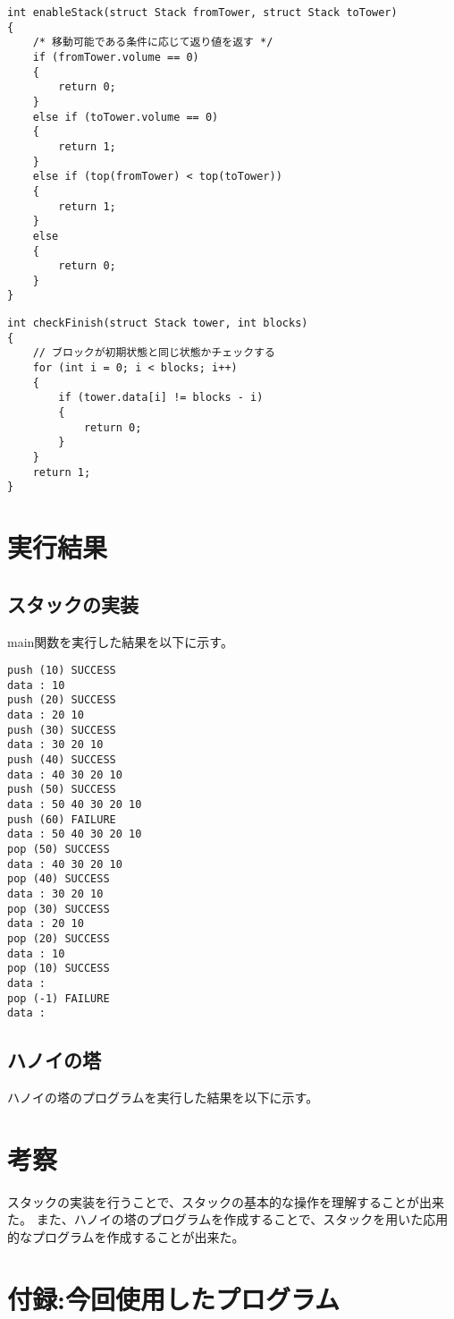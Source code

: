 \documentclass[a4paper,11pt]{jsarticle}
\begin{document}
\begin{lstlisting}[caption={enableStack関数}, label={lst:enablestack}]
int enableStack(struct Stack fromTower, struct Stack toTower)
{
    /* 移動可能である条件に応じて返り値を返す */
    if (fromTower.volume == 0)
    {
        return 0;
    }
    else if (toTower.volume == 0)
    {
        return 1;
    }
    else if (top(fromTower) < top(toTower))
    {
        return 1;
    }
    else
    {
        return 0;
    }
}
\end{lstlisting}
\begin{lstlisting}[caption={checkFinish関数}, label={lst:checkfinish}]
int checkFinish(struct Stack tower, int blocks)
{
    // ブロックが初期状態と同じ状態かチェックする
    for (int i = 0; i < blocks; i++)
    {
        if (tower.data[i] != blocks - i)
        {
            return 0;
        }
    }
    return 1;
}
\end{lstlisting}

\section{実行結果}
\subsection{スタックの実装}
main関数を実行した結果を以下に示す。
\begin{verbatim}
push (10) SUCCESS
data : 10 
push (20) SUCCESS
data : 20 10 
push (30) SUCCESS
data : 30 20 10 
push (40) SUCCESS
data : 40 30 20 10 
push (50) SUCCESS
data : 50 40 30 20 10 
push (60) FAILURE
data : 50 40 30 20 10 
pop (50) SUCCESS
data : 40 30 20 10 
pop (40) SUCCESS
data : 30 20 10 
pop (30) SUCCESS
data : 20 10 
pop (20) SUCCESS
data : 10 
pop (10) SUCCESS
data : 
pop (-1) FAILURE
data : 
\end{verbatim}
\subsection{ハノイの塔}
ハノイの塔のプログラムを実行した結果を以下に示す。

\section{考察}
スタックの実装を行うことで、スタックの基本的な操作を理解することが出来た。
また、ハノイの塔のプログラムを作成することで、スタックを用いた応用的なプログラムを作成することが出来た。

\section{付録:今回使用したプログラム}


\end{document}
